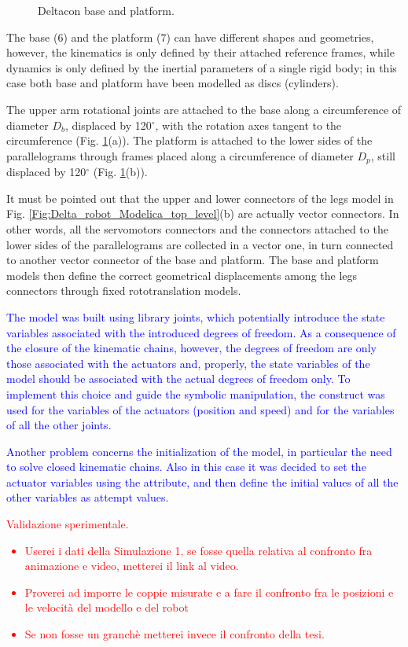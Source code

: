 \documentclass[]{interact}
\theoremstyle{plain}%
\theoremstyle{definition}
\theoremstyle{remark}
\begin{document}
{\begin{figure}
\caption{Deltacon base and platform.} \label{Fig:Deltacon_kinematics_parameters}
\end{figure}
The base (6) and the platform (7) can have different shapes and geometries, however, the kinematics is only defined by their attached reference frames, while dynamics is only defined by the inertial parameters of a single rigid body; in this case both base and platform have been modelled as discs (cylinders).

The upper arm rotational joints are attached to the base along a circumference of diameter $D_b$, displaced by 120$^\circ$, with the rotation axes tangent to the circumference (Fig. \ref{Fig:Deltacon_kinematics_parameters}(a)). The platform is attached to the lower sides of the parallelograms through frames placed along a circumference of diameter $D_p$, still displaced by 120$^\circ$ (Fig. \ref{Fig:Deltacon_kinematics_parameters}(b)).

It must be pointed out that the upper and lower connectors of the legs model in Fig. \ref{Fig:Delta_robot_Modelica_top_level}(b) are actually vector connectors. In other words, all the servomotors connectors and the connectors attached to the lower sides of the parallelograms are collected in a vector one, in turn connected to another vector connector of the base and platform. The base and platform models then define the correct geometrical displacements among the legs connectors through fixed rototranslation models.

\textcolor{blue}{
The model was built using library joints, which potentially introduce the state variables associated with the introduced degrees of freedom.
As a consequence of the closure of the kinematic chains, however, the degrees of freedom are only those associated with the actuators and, properly, the state variables of the model should be associated with the actual degrees of freedom only.
To implement this choice and guide the symbolic manipulation, the construct  was used for the variables of the actuators (position and speed) and  for the variables of all the other joints.
}

\textcolor{blue}{
Another problem concerns the initialization of the model, in particular the need to solve closed kinematic chains.
Also in this case it was decided to set the actuator variables using the  attribute, and then define the initial values of all the other variables as attempt values.
}

\textcolor{red}{
Validazione sperimentale.
\begin{itemize}
  \item Userei i dati della Simulazione 1, se fosse quella relativa al confronto fra animazione e video, metterei il link al video.
  \item Proverei ad imporre le coppie misurate e a fare il confronto fra le posizioni e le velocit\`{a} del modello e del robot
  \item Se non fosse un granch\`{e} metterei invece il confronto della tesi.
\end{itemize}
}

}
\end{document}
